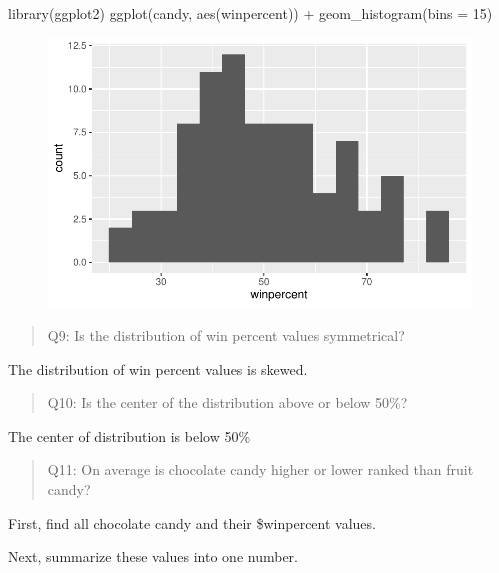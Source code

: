 \documentclass[
  letterpaper,
  DIV=11,
  numbers=noendperiod]{scrartcl}
\newenvironment{Shaded}{\begin{snugshade}}{\end{snugshade}}
\newcommand{\AttributeTok}[1]{\textcolor[rgb]{0.40,0.45,0.13}{#1}}
\newcommand{\DecValTok}[1]{\textcolor[rgb]{0.68,0.00,0.00}{#1}}
\newcommand{\FunctionTok}[1]{\textcolor[rgb]{0.28,0.35,0.67}{#1}}
\newcommand{\NormalTok}[1]{\textcolor[rgb]{0.00,0.23,0.31}{#1}}
\newcommand{\SpecialCharTok}[1]{\textcolor[rgb]{0.37,0.37,0.37}{#1}}
\begin{document}
\begin{Shaded}
\begin{Highlighting}[]
\FunctionTok{library}\NormalTok{(ggplot2)}
\FunctionTok{ggplot}\NormalTok{(candy, }\FunctionTok{aes}\NormalTok{(winpercent)) }\SpecialCharTok{+}
  \FunctionTok{geom\_histogram}\NormalTok{(}\AttributeTok{bins =} \DecValTok{15}\NormalTok{)}
\end{Highlighting}
\end{Shaded}

\begin{figure}[H]

{\centering \includegraphics{halloween-mini-project_files/figure-pdf/unnamed-chunk-9-1.pdf}

}

\end{figure}

\begin{quote}
Q9: Is the distribution of win percent values symmetrical?
\end{quote}

The distribution of win percent values is skewed.

\begin{quote}
Q10: Is the center of the distribution above or below 50\%?
\end{quote}

The center of distribution is below 50\%

\begin{quote}
Q11: On average is chocolate candy higher or lower ranked than fruit
candy?
\end{quote}

First, find all chocolate candy and their \$winpercent values.

Next, summarize these values into one number.
\end{document}

